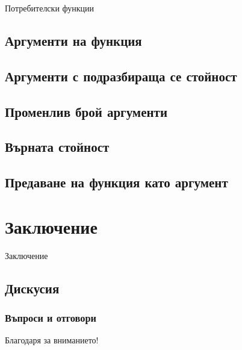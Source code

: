 \documentclass{beamer}
\begin{document}
\begin{frame}
\center \huge{Потребителски функции}
\end{frame}

\subsection{Аргументи на функция}

\subsection{Аргументи с подразбираща се стойност}

\subsection{Променлив брой аргументи}

\subsection{Върната стойност}

\subsection{Предаване на функция като аргумент}

\section{Заключение}

\begin{frame}
\center \huge{Заключение}
\end{frame}

\subsection{Дискусия}

\begin{frame}
\frametitle{Въпроси и отговори}
\center \huge{Благодаря за вниманието!}
\end{frame}
\end{document}
